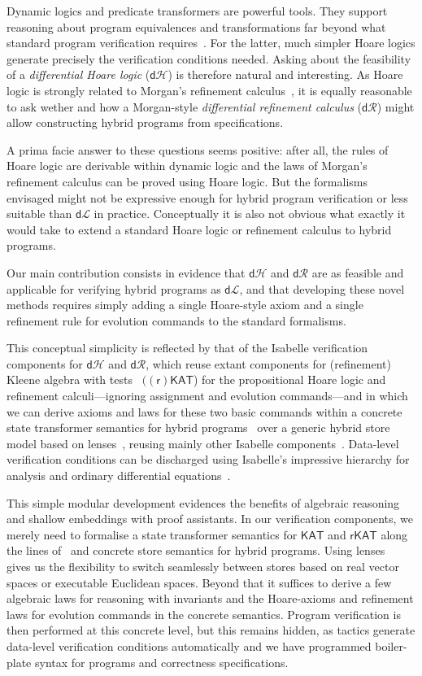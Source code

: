 \documentclass[envcountsame]{llncs}
\newcommand{\KAT}{\mathsf{KAT}}
\newcommand{\rKAT}{\mathsf{rKAT}}
\newcommand{\dL}{\mathsf{d}\mathcal{L}}
\newcommand{\dH}{\mathsf{d}\mathcal{H}}
\newcommand{\dR}{\mathsf{d}\mathcal{R}}
\begin{document}
Dynamic logics and predicate transformers are powerful tools. They
support reasoning about program equivalences and transformations
far beyond what standard program verification requires~\cite{BackW98}. For
the latter, much simpler Hoare logics generate precisely the
verification conditions needed.  Asking about the feasibility of a
\emph{differential Hoare logic} ($\dH$) is therefore natural and
interesting.  As Hoare logic is strongly related to Morgan's
refinement calculus~\cite{Morgan94}, it is equally reasonable to
ask wether and how a Morgan-style \emph{differential refinement calculus}
($\dR$) might allow constructing hybrid programs from specifications.

A prima facie answer to these questions seems positive: after all, the
rules of Hoare logic are derivable within dynamic logic and the laws
of Morgan's refinement calculus can be proved using Hoare logic. But
the formalisms envisaged might not be expressive enough for hybrid
program verification or less suitable than $\dL$ in
practice. Conceptually it is also not obvious what exactly it would
take to extend a standard Hoare logic or refinement calculus to hybrid
programs.

Our main contribution consists in evidence that $\dH$ and $\dR$ are as
feasible and applicable for verifying hybrid programs as $\dL$, and
that developing these novel methods requires simply adding a single
Hoare-style axiom and a single refinement rule for evolution commands
to the standard formalisms.

This conceptual simplicity is reflected by that of the Isabelle
verification components for $\dH$ and $\dR$, which reuse extant
components for (refinement) Kleene algebra with
tests~\cite{Kozen97,ArmstrongGS16,afp:vericomp} $(\mathsf{(r)KAT}$)
for the propositional Hoare logic and refinement calculi---ignoring
assignment and evolution commands---and in which we can derive axioms
and laws for these two basic commands within a concrete state
transformer semantics for hybrid programs~\cite{MuniveS19} over a
generic hybrid store model based on lenses~\cite{FosterZW16}, reusing
mainly other Isabelle components~\cite{afp:hybrid,afp:simon?}.
Data-level verification conditions can be discharged using Isabelle's
impressive hierarchy for analysis and ordinary differential
equations~\cite{ImmlerH12a}.

This simple modular development evidences the benefits of algebraic
reasoning and shallow embeddings with proof assistants. In our
verification components, we merely need to formalise a state
transformer semantics for $\KAT$ and $\rKAT$ along the lines
of~\cite{afp:hybrid} and concrete store semantics for hybrid
programs. Using lenses~\cite{FosterZW16} gives us the flexibility to
switch seamlessly between stores based on real vector spaces or
executable Euclidean spaces. Beyond that it suffices to derive a few
algebraic laws for reasoning with invariants and the Hoare-axioms and
refinement laws for evolution commands in the concrete
semantics. Program verification is then performed at this concrete
level, but this remains hidden, as tactics generate data-level
verification conditions automatically and we have programmed
boiler-plate syntax for programs and correctness specifications.
\end{document}
